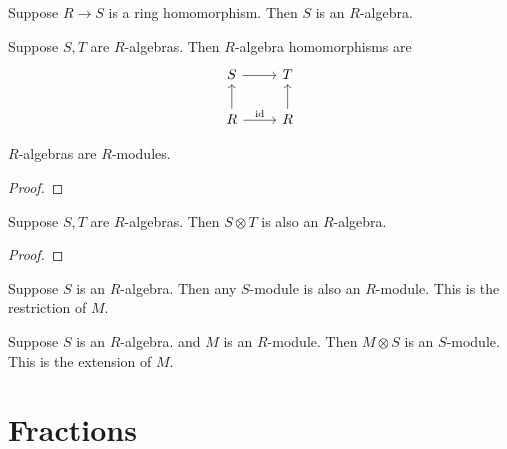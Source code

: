\begin{definition}
    Suppose \(R \to S\) is a ring homomorphism.
    Then \(S\) is an \(R\)-algebra.
\end{definition}
\begin{definition}
    Suppose \(S,T\) are \(R\)-algebras.
    Then \(R\)-algebra homomorphisms are
    \begin{equation*}
        \begin{tikzcd}
            S \arrow{r} & T \\
            R \arrow{u} \arrow{r}{\id} & R \arrow{u}
        \end{tikzcd}
    \end{equation*}
\end{definition}
\begin{proposition}
    \(R\)-algebras are \(R\)-modules.
\end{proposition}
\begin{proof}
    
\end{proof}

\begin{proposition}
    Suppose \(S,T\) are \(R\)-algebras.
    Then \(S \otimes T\) is also an \(R\)-algebra.
\end{proposition}
\begin{proof}
    
\end{proof}

\begin{definition}
    Suppose \(S\) is an \(R\)-algebra.
    Then any \(S\)-module is also an \(R\)-module.
    This is the restriction of \(M\).
\end{definition}
\begin{definition}
    Suppose \(S\) is an \(R\)-algebra. and \(M\) is an \(R\)-module.
    Then \(M \otimes S\) is an \(S\)-module.
    This is the extension of \(M\).
\end{definition}


\section{Fractions}

